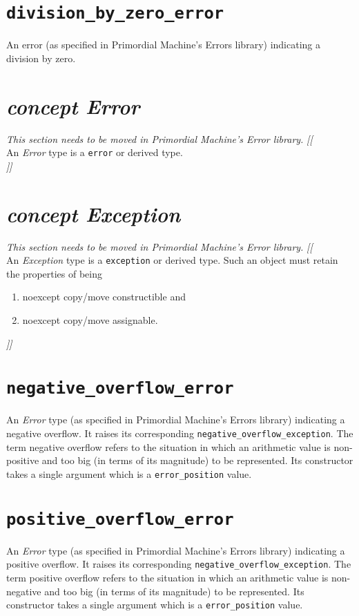 \documentclass[oneside]{book}
\begin{document}
\section{\texttt{division\_by\_zero\_error}}
An error (as specified in Primordial Machine's Errors library) indicating a division by zero.

\section{\textit{concept Error}}
\textit{\color{orange}This section needs to be moved in Primordial Machine's Error library.}
\noindent\textit{\color{orange}[[}\\
An \textit{Error} type is a \texttt{error} or derived type.\\
\noindent\textit{\color{orange}]]}

\section{\textit{concept Exception}}
\textit{\color{orange}This section needs to be moved in Primordial Machine's Error library.}
\noindent\textit{\color{orange}[[}\\
An \textit{Exception} type is a \texttt{exception} or derived type.
Such an object must retain the properties of being
\begin{enumerate}
  \item noexcept copy/move constructible and
  \item noexcept copy/move assignable.
\end{enumerate}
\noindent\textit{\color{orange}]]}

\section{\texttt{negative\_overflow\_error}}
An \textit{Error} type (as specified in Primordial Machine's Errors library) indicating a negative overflow.
It raises its corresponding \texttt{negative\_overflow\_exception}.
The term negative overflow refers to the situation in which an arithmetic value is non-positive and
too big (in terms of its magnitude) to be represented. Its constructor takes a single argument which
is a \texttt{error\_position} value.

\section{\texttt{positive\_overflow\_error}}
An \textit{Error} type (as specified in Primordial Machine's Errors library) indicating a positive overflow.
It raises its corresponding \texttt{negative\_overflow\_exception}.
The term positive overflow refers to the situation in which an arithmetic value is non-negative and
too big (in terms of its magnitude) to be represented. Its constructor takes a single argument which
is a \texttt{error\_position} value.
\end{document}
